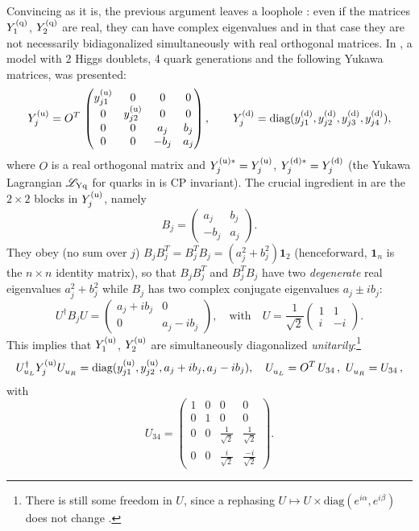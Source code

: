 \documentclass[12pt,a4paper]{article}
\begin{document}
Convincing as it is, the previous argument leaves a loophole \cite{Ecker:1987md,Gronau:1987xz}: even if the matrices $Y_{1}^{\rm (q)}$, $Y_{2}^{\rm (q)}$ are real, they can have complex eigenvalues and in that case they are not necessarily bidiagonalized simultaneously with real orthogonal matrices. In \cite{Ecker:1987md}, a model with 2 Higgs doublets, 4 quark generations and the following Yukawa matrices, was presented:
\begin{equation}\label{eq:4gen:ex:00}
  Y_{j}^{\rm (u)}=O^T\,\begin{pmatrix}y_{j1}^{\rm (u)}&0&0&0\\ 0&y_{j2}^{\rm (u)}&0&0\\ 0&0&a_j&b_j\\ 0&0&-b_j&a_j\end{pmatrix},\qquad Y_{j}^{\rm (d)}=\text{diag}(y_{j1}^{\rm (d)},y_{j2}^{\rm (d)},y_{j3}^{\rm (d)},y_{j4}^{\rm (d)}),
\end{equation}
where $O$ is a real orthogonal matrix and $Y_{j}^{\rm (u)\ast}=Y_{j}^{\rm (u)}$, $Y_{j}^{\rm (d)\ast}=Y_{j}^{\rm (d)}$ (the Yukawa Lagrangian $\mathscr L_{\rm Yq}$ for quarks in  is CP invariant). The crucial ingredient in  are the $2\times 2$ blocks in $Y_{j}^{\rm (u)}$, namely
\begin{equation}\label{eq:block2x2}
    B_j=\begin{pmatrix}a_j & b_j\\ -b_j & a_j \end{pmatrix}.
\end{equation}
They obey (no sum over $j$) $B_jB_j^T=B_j^TB_j=(a_j^2+b_j^2)\mathbf{1}_2$ (henceforward, $\mathbf{1}_n$ is the $n\times n$ identity matrix), so that $B_jB_j^T$ and $B_j^TB_j$ have two \emph{degenerate} real eigenvalues $a_j^2+b_j^2$ while $B_j$ has two complex conjugate eigenvalues $a_j\pm ib_j$:
\begin{equation}\label{eq:block2x2:diag:0}
 U^\dagger B_j U= \begin{pmatrix}a_j+ib_j&0\\ 0&a_j-ib_j\end{pmatrix},\quad \text{with}\quad U =\frac{1}{\sqrt 2}\begin{pmatrix}1 & 1\\ i&-i\end{pmatrix}.
\end{equation}
This implies that $Y_{1}^{\rm (u)}$, $Y_{2}^{\rm (u)}$ are simultaneously diagonalized \emph{unitarily}:\footnote{There is still some freedom in $U$, since a rephasing $U\mapsto U\times\text{diag}(e^{i\alpha},e^{i\beta})$ does not change .}
\begin{equation}\label{eq:block2x2:YUdiag:0}
 \ULUd\YU{j}\URU=\text{diag}(\yU{j1},\yU{j2},a_j+ib_j,a_j-ib_j),\quad 
 \ULU=O^T\,U_{34}\,,\ \URU=U_{34}\,,
\end{equation}
with 
\begin{equation}
 U_{34}=\begin{pmatrix}1&0&0&0\\ 0&1&0&0\\ 0&0&\frac{1}{\sqrt 2}& \frac{1}{\sqrt 2}\\ 0&0&\frac{i}{\sqrt 2}&\frac{-i}{\sqrt 2}\end{pmatrix}.
\end{equation}
\end{document}
